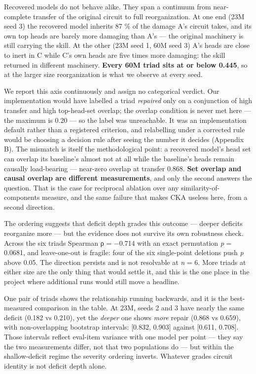 \documentclass{article}
\begin{document}
Recovered models do not behave alike. They span a continuum from near-complete transfer of
the original circuit to full reorganization. At one end (23M seed 3) the recovered model
inherits 87 \% of the damage A's circuit takes, and its own top heads are barely more damaging
than A's --- the original machinery is still carrying the skill. At the other (23M seed 1, 60M
seed 3) A's heads are close to inert in C while C's own heads are five times more damaging:
the skill returned in different machinery. \textbf{Every 60M triad sits at or below 0.445}, so at
the larger size reorganization is what we observe at every seed.

We report this axis continuously and assign no categorical verdict. Our implementation would
have labelled a triad \emph{repaired} only on a conjunction of high transfer and high
top-head-set overlap; the overlap condition is never met here --- the maximum is 0.20 --- so the
label was unreachable. It was an implementation default rather than a registered criterion,
and relabelling under a corrected rule would be choosing a decision rule after seeing the
number it decides (Appendix B). The mismatch is itself the methodological point: a recovered
model's head set can overlap its baseline's almost not at all while the baseline's heads
remain causally load-bearing --- near-zero overlap at transfer 0.868. \textbf{Set overlap and causal
overlap are different measurements}, and only the second answers the question. That is the
case for reciprocal ablation over any similarity-of-components measure, and the same failure
that makes CKA useless here, from a second direction.

The ordering suggests that deficit depth grades this outcome --- deeper deficits reorganize
more --- but the evidence does not survive its own robustness check. Across the six triads
Spearman ρ = −0.714 with an exact permutation \emph{p} = 0.0681, and leave-one-out is fragile:
four of the six single-point deletions push \emph{p} above 0.05. The direction persists and is not
resolvable at \emph{n} = 6. More triads at either size are the only thing that would settle it,
and this is the one place in the project where additional runs would still move a headline.

One pair of triads shows the relationship running backwards, and it is the best-measured
comparison in the table. At 23M, seeds 2 and 3 have nearly the same deficit (0.182 vs 0.210),
yet the \emph{deeper} one shows \emph{more} repair (0.868 vs 0.659), with non-overlapping bootstrap
intervals: {[}0.832, 0.903{]} against {[}0.611, 0.708{]}. Those intervals reflect eval-item variance
with one model per point --- they say the two measurements differ, not that two populations do
--- but within the shallow-deficit regime the severity ordering inverts. Whatever grades
circuit identity is not deficit depth alone.
\end{document}
